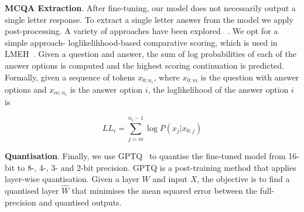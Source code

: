 \textbf{MCQA Extraction}. After fine-tuning, our model does not
necessarily output a single letter response. To extract a single letter
answer from the model we apply post-processing. A variety of approaches have been explored
~\cite{mcqa-scoring}. We opt for a simple
approach-  loglikelihhood-based comparative scoring, which is used in
LMEH~\cite{lmeh}. Given a question
and answer, the sum of log probabilities of each of the
answer options is computed and the highest scoring continuation is predicted.
Formally, given a sequence of tokens $x_{0:n_i}$, where $x_{0:m}$ is the
question with answer options and $x_{m:n_i}$ is the answer option $i$, 
the loglikelihood of the answer option $i$ is

\begin{equation}
    \label{eq:loglikelihood-comparative-scoring}
    LL_i = \sum_{j=m}^{n_i-1}\log P(x_j |x_{0:j})
\end{equation}

\textbf{Quantisation}. Finally, we use GPTQ~\cite{gptq} to quantise the fine-tuned model from 16-bit to 8-, 4-, 3- and 2-bit precision. GPTQ is a post-training method that applies layer-wise quantisation. Given a layer $W$ and input $X$, the objective is to find a quantised layer $\hat{W}$ that minimises the mean squared error between the full-precision and quantised outputs. 